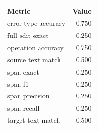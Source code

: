 \begin{tabular}{lr}
\toprule
Metric & Value \\
\midrule
error type accuracy & 0.750 \\
full edit exact & 0.250 \\
operation accuracy & 0.750 \\
source text match & 0.500 \\
span exact & 0.250 \\
span f1 & 0.250 \\
span precision & 0.250 \\
span recall & 0.250 \\
target text match & 0.500 \\
\bottomrule
\end{tabular}
